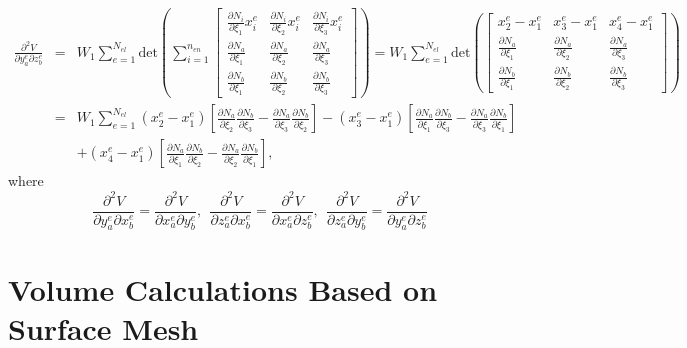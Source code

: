 \documentclass[12pt,aps,pre]{revtex4}
\begin{document}
\begin{eqnarray}
\frac{\partial^2 V}{\partial y_a^e \partial z_b^e} &=& W_1\sum_{e=1}^{N_{el}} \text{det}\left(\sum_{i=1}^{n_{en}} \begin{bmatrix}
\frac{\partial N_i}{\partial \xi_1}x_i^e  & \frac{\partial N_i}{\partial \xi_2}x_i^e & \frac{\partial N_i}{\partial \xi_3}x_i^e \\
%
\frac{\partial N_a}{\partial \xi_1} & \frac{\partial N_a}{\partial \xi_2} & \frac{\partial N_a}{\partial \xi_3}  \\
%
 \frac{\partial N_b}{\partial \xi_1}  & \frac{\partial N_b}{\partial \xi_2} & \frac{\partial N_b}{\partial \xi_3}
\end{bmatrix}\right) 
%
= W_1\sum_{e=1}^{N_{el}} \text{det}\left(\begin{bmatrix}
x_2^e - x_1^e & x_3^e - x_1^e & x_4^e - x_1^e \\
%
\frac{\partial N_a}{\partial \xi_1} & \frac{\partial N_a}{\partial \xi_2} & \frac{\partial N_a}{\partial \xi_3}  \\
%
 \frac{\partial N_b}{\partial \xi_1}  & \frac{\partial N_b}{\partial \xi_2} & \frac{\partial N_b}{\partial \xi_3}
\end{bmatrix}\right) \nonumber\\
&=&W_1\sum_{e=1}^{N_{el}}(x_2^e - x_1^e)\left[\frac{\partial N_a}{\partial \xi_2}\frac{\partial N_b}{\partial \xi_3}-\frac{\partial N_a}{\partial \xi_3}\frac{\partial N_b}{\partial \xi_2}\right] 
%
-(x_3^e - x_1^e)\left[\frac{\partial N_a}{\partial \xi_1}\frac{\partial N_b}{\partial \xi_3}-\frac{\partial N_a}{\partial \xi_3}\frac{\partial N_b}{\partial \xi_1}\right] \nonumber\\
%
&&+(x_4^e - x_1^e)\left[\frac{\partial N_a}{\partial \xi_1}\frac{\partial N_b}{\partial \xi_2}-\frac{\partial N_a}{\partial \xi_2}\frac{\partial N_b}{\partial \xi_1}\right],
\label{eq:dV-offdiag}
\end{eqnarray}
%
where 
%
\begin{equation}
\frac{\partial^2 V}{\partial y_a^e \partial x_b^e} = \frac{\partial^2 V}{\partial x_a^e \partial y_b^e}, \ \
%
\frac{\partial^2 V}{\partial z_a^e \partial x_b^e} = \frac{\partial^2 V}{\partial x_a^e \partial z_b^e}, \ \
%
\frac{\partial^2 V}{\partial z_a^e \partial y_b^e} = \frac{\partial^2 V}{\partial y_a^e \partial z_b^e}
\end{equation}

\section{Volume Calculations Based on Surface Mesh}
\end{document}
